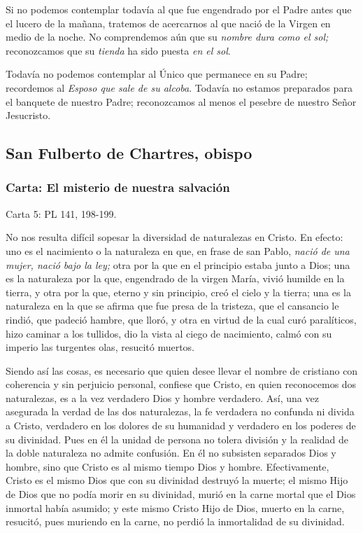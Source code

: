 \begin{body}
\begin{body}
Si no podemos contemplar todavía al que fue engendrado por el Padre antes que el lucero de la mañana, tratemos de acercarnos al que nació de la Virgen en medio de la noche. No comprendemos aún que su \emph{nombre dura como el sol;} reconozcamos que su \emph{tienda} ha sido puesta \emph{en el sol}.

Todavía no podemos contemplar al Único que permanece en su Padre; recordemos al \emph{Esposo que sale de su alcoba}. Todavía no estamos preparados para el banquete de nuestro Padre; reconozcamos al menos el pesebre de nuestro Señor Jesucristo.

\subsection{San Fulberto de Chartres, obispo}

\subsubsection{Carta: El misterio de nuestra salvación}

Carta 5: PL 141, 198-199.

No nos resulta difícil sopesar la diversidad de naturalezas en Cristo. En efecto: uno es el nacimiento o la naturaleza en que, en frase de san Pablo, \emph{nació de una mujer, nació bajo la ley;} otra por la que en el principio estaba junto a Dios; una es la naturaleza por la que, engendrado de la virgen María, vivió humilde en la tierra, y otra por la que, eterno y sin principio, creó el cielo y la tierra; una es la naturaleza en la que se afirma que fue presa de la tristeza, que el cansancio le rindió, que padeció hambre, que lloró, y otra en virtud de la cual curó paralíticos, hizo caminar a los tullidos, dio la vista al ciego de nacimiento, calmó con su imperio las turgentes olas, resucitó muertos.

Siendo así las cosas, es necesario que quien desee llevar el nombre de cristiano con coherencia y sin perjuicio personal, confiese que Cristo, en quien reconocemos dos naturalezas, es a la vez verdadero Dios y hombre verdadero. Así, una vez asegurada la verdad de las dos naturalezas, la fe verdadera no confunda ni divida a Cristo, verdadero en los dolores de su humanidad y verdadero en los poderes de su divinidad. Pues en él la unidad de persona no tolera división y la realidad de la doble naturaleza no admite confusión. En él no subsisten separados Dios y hombre, sino que Cristo es al mismo tiempo Dios y hombre. Efectivamente, Cristo es el mismo Dios que con su divinidad destruyó la muerte; el mismo Hijo de Dios que no podía morir en su divinidad, murió en la carne mortal que el Dios inmortal había asumido; y este mismo Cristo Hijo de Dios, muerto en la carne, resucitó, pues muriendo en la carne, no perdió la inmortalidad de su divinidad.


\end{body}
\end{body}
